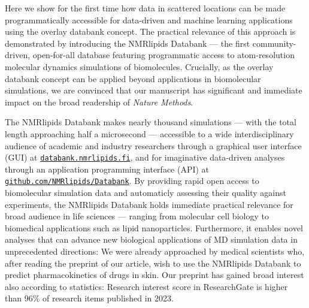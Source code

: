 \documentclass[11pt]{letter}
\begin{document}
Here we show for the first time how data in scattered locations can be made programmatically accessible for data-driven and machine learning applications 
using the overlay databank concept. 
The practical relevance of this approach is demonstrated by introducing the NMRlipids Databank --- the first community-driven, open-for-all database featuring programmatic access to atom-resolution molecular dynamics simulations of biomolecules. Crucially, as the overlay databank concept can be applied beyond applications in biomolecular simulations, we are convinced that our manuscript has significant and immediate impact on the broad readership of \textit{Nature Methods}.

The NMRlipids Databank makes nearly thousand simulations --- with the total length approaching half a microsecond --- accessible to a wide interdisciplinary audience of academic and industry researchers through a graphical user interface (GUI) at \href{https://databank.nmrlipids.fi/}{\tt databank.nmrlipids.fi}, and for imaginative data-driven analyses through an application programming interface (API) at \href{https://github.com/NMRlipids/Databank}{\tt github.com/NMRlipids/Databank}. By providing rapid open access to biomolecular simulation data and automaticly assessing their quality against experiments, the NMRlipids Databank holds immediate practical relevance for broad audience in life sciences --- ranging from molecular cell biology to biomedical applications such as lipid nanoparticles. Furthermore, it enables novel analyses that can advance new biological applications of MD simulation data in unprecedented directions: We were already approached by medical scientists who, after reading the preprint of our article, wish to use the NMRlipids Databank to predict pharmacokinetics of drugs in skin. Our preprint has gained broad interest also according to statistics: Research interest score in ResearchGate is higher than 96\% of research items published in 2023.

\end{document}
